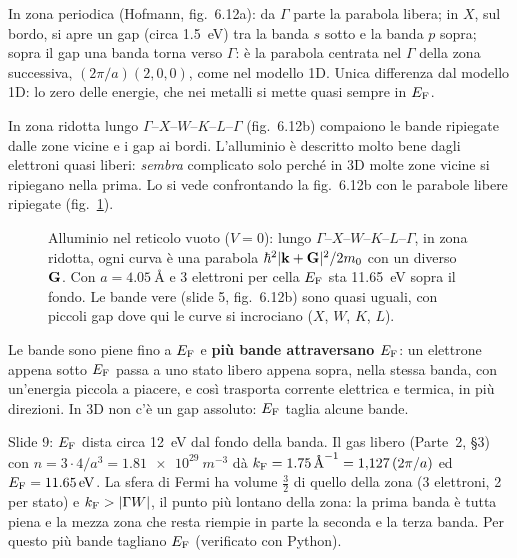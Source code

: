 \documentclass[11pt,a4paper]{article}
\begin{document}
In zona periodica (Hofmann, fig.~6.12a): da $\Gamma$ parte la parabola libera; in $X$, sul bordo, si apre un gap (circa \SI{1.5}{eV}) tra la banda
$s$ sotto e la banda $p$ sopra; sopra il gap una banda torna verso $\Gamma$: è la parabola centrata nel $\Gamma$ della zona successiva,
$(2\pi/a)(2,0,0)$, come nel modello 1D. Unica differenza dal modello 1D: lo zero delle energie, che nei metalli si mette quasi sempre in $E_{\mathrm F}$.

In zona ridotta lungo $\Gamma$--$X$--$W$--$K$--$L$--$\Gamma$ (fig.~6.12b) compaiono le bande ripiegate dalle zone vicine e i gap ai bordi. L'alluminio
è descritto molto bene dagli elettroni quasi liberi: \emph{sembra} complicato solo perché in 3D molte zone vicine si ripiegano nella prima. Lo si vede
confrontando la fig.~6.12b con le parabole libere ripiegate (fig.~\ref{fig:al}).

\begin{figure}[tbp]
\centering
{}
\caption{Alluminio nel reticolo vuoto ($V=0$): lungo $\Gamma$--$X$--$W$--$K$--$L$--$\Gamma$, in zona ridotta, ogni curva è una parabola
$\hbar^2|\mathbf k+\mathbf G|^2/2m_0$ con un diverso $\mathbf G$. Con $a=\SI{4.05}{\angstrom}$ e 3 elettroni per cella $E_{\mathrm F}$ sta \SI{11.65}{eV} sopra il fondo. Le bande
vere (slide 5, fig.~6.12b) sono quasi uguali, con piccoli gap dove qui le curve si incrociano ($X$, $W$, $K$, $L$).}\label{fig:al}
\end{figure}

Le bande sono piene fino a $E_{\mathrm F}$ e \textbf{più bande attraversano $E_{\mathrm F}$}: un elettrone appena sotto $E_{\mathrm F}$ passa a uno stato libero appena sopra, nella
stessa banda, con un'energia piccola a piacere, e così trasporta corrente elettrica e termica, in più direzioni. In 3D non c'è un gap assoluto:
$E_{\mathrm F}$ taglia alcune bande.

\begin{esempio}
Slide 9: $E_{\mathrm F}$ dista circa \SI{12}{eV} dal fondo della banda. Il gas libero (Parte~2, §3) con $n=3\cdot4/a^3=\SI{1.81e29}{m^{-3}}$ dà
$k_{\mathrm F}=\SI{1.75}{\angstrom^{-1}}=1{,}127\,(2\pi/a)$ ed $E_{\mathrm F}=\SI{11.65}{eV}$. La sfera di Fermi ha volume $\frac32$ di quello della zona (3 elettroni, 2
per stato) e $k_{\mathrm F}>|\Gamma W|$, il punto più lontano della zona: la prima banda è tutta piena e la mezza zona che resta riempie in parte la seconda e la
terza banda. Per questo più bande tagliano $E_{\mathrm F}$ (verificato con Python).
\end{esempio}
\end{document}
